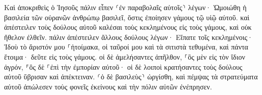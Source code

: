 \documentclass{openreader}
\begin{document}
Καὶ ἀποκριθεὶς ὁ Ἰησοῦς πάλιν εἶπεν ⸂ἐν παραβολαῖς αὐτοῖς⸃ λέγων· 
Ὡμοιώθη ἡ βασιλεία τῶν οὐρανῶν ἀνθρώπῳ βασιλεῖ, ὅστις ἐποίησεν γάμους τῷ υἱῷ αὐτοῦ. 
καὶ ἀπέστειλεν τοὺς δούλους αὐτοῦ καλέσαι τοὺς κεκλημένους εἰς τοὺς γάμους, καὶ οὐκ ἤθελον ἐλθεῖν. 
πάλιν ἀπέστειλεν ἄλλους δούλους λέγων· Εἴπατε τοῖς κεκλημένοις· Ἰδοὺ τὸ ἄριστόν μου ⸀ἡτοίμακα, οἱ ταῦροί μου καὶ τὰ σιτιστὰ τεθυμένα, καὶ πάντα ἕτοιμα· δεῦτε εἰς τοὺς γάμους. 
οἱ δὲ ἀμελήσαντες ἀπῆλθον, ⸀ὃς μὲν εἰς τὸν ἴδιον ἀγρόν, ⸁ὃς δὲ ⸀ἐπὶ τὴν ἐμπορίαν αὐτοῦ· 
οἱ δὲ λοιποὶ κρατήσαντες τοὺς δούλους αὐτοῦ ὕβρισαν καὶ ἀπέκτειναν. 
⸂ὁ δὲ βασιλεὺς⸃ ὠργίσθη, καὶ πέμψας τὰ στρατεύματα αὐτοῦ ἀπώλεσεν τοὺς φονεῖς ἐκείνους καὶ τὴν πόλιν αὐτῶν ἐνέπρησεν. 
\end{document}
